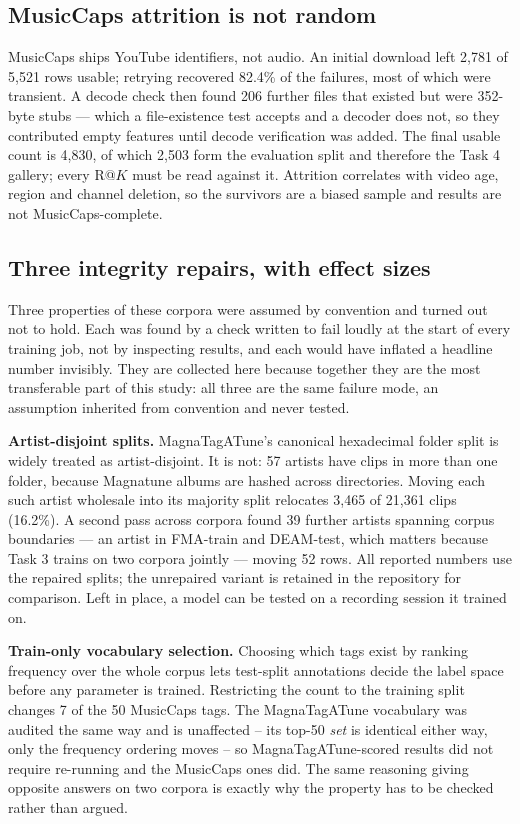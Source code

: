 \documentclass[conference]{IEEEtran}
\newcommand{\MCTest}{2{,}503}
\begin{document}
\subsection{MusicCaps attrition is not random}
MusicCaps ships YouTube identifiers, not audio. An initial download left 2{,}781
of 5{,}521 rows usable; retrying recovered 82.4\% of the failures, most of which
were transient. A decode check then found 206 further files that existed but
were 352-byte stubs --- which a file-existence test accepts and a decoder does
not, so they contributed empty features until decode verification was added.
The final usable count is 4{,}830, of which \MCTest{} form the evaluation split
and therefore the Task 4 gallery; every R@$K$ must be read against it.
Attrition correlates with video age, region and channel deletion, so the
survivors are a biased sample and results are not MusicCaps-complete.

\subsection{Three integrity repairs, with effect sizes}
\label{sec:methodology}
Three properties of these corpora were assumed by convention and turned out not
to hold. Each was found by a check written to fail loudly at the start of every
training job, not by inspecting results, and each would have inflated a headline
number invisibly. They are collected here because together they are the most
transferable part of this study: all three are the same failure mode, an
assumption inherited from convention and never tested.

\textbf{Artist-disjoint splits.} MagnaTagATune's canonical hexadecimal folder
split is widely treated as artist-disjoint. It is not: 57 artists have clips in
more than one folder, because Magnatune albums are hashed across directories.
Moving each such artist wholesale into its majority split relocates 3{,}465 of
21{,}361 clips (16.2\%). A second pass across corpora found 39 further artists
spanning corpus boundaries --- an artist in FMA-train and DEAM-test, which
matters because Task 3 trains on two corpora jointly --- moving 52 rows. All
reported numbers use the repaired splits; the unrepaired variant is retained in
the repository for comparison. Left in place, a model can be tested on a
recording session it trained on.

\textbf{Train-only vocabulary selection.} Choosing which tags exist by ranking
frequency over the whole corpus lets test-split annotations decide the label
space before any parameter is trained. Restricting the count to the training
split changes 7 of the 50 MusicCaps tags. The MagnaTagATune vocabulary was
audited the same way and is unaffected -- its top-50 \emph{set} is identical
either way, only the frequency ordering moves -- so MagnaTagATune-scored results
did not require re-running and the MusicCaps ones did. The same reasoning giving
opposite answers on two corpora is exactly why the property has to be checked
rather than argued.
\end{document}
